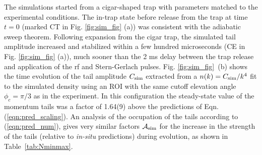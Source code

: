	The simulations started from a cigar-shaped trap with parameters matched to the experimental conditions. 
	The in-trap state before release from the trap at time $t=0$ (marked CT in Fig. \ref{fig:sim_fig} (a)) was consistent with the adiabatic sweep theorem. 
	Following expansion from the cigar trap, the simulated tail amplitude increased and stabilized within a few hundred microseconds (CE in Fig. \ref{fig:sim_fig} (a)), much sooner than the 2 ms delay between the trap release and application of the rf and Stern-Gerlach pulses. 
	Fig. \ref{fig:sim_fig}~(b) shows the time evolution of the tail amplitude {$C_{\rm sim}$ extracted from a $n(k)=C_{\rm sim}/k^4$ fit to the simulated density} %
	using {an ROI with the same cutoff elevation angle $\phi_c=\pi/3$ as in the experiment.}  
	In this configuration the steady-state value of the momentum tails was a factor of 1.64(9) above the predictions of Eqn. (\ref{eqn:pred_scaling}). 
	{An analysis of the occupation of the tails according to (\ref{eqn:pred_num}), gives very similar factors $\mathcal{A}_{\rm sim}$ for the increase in the strength of the tails (relative to \emph{in-situ} predictions) during evolution, as shown in Table~\ref{tab:Nminmax}.}

